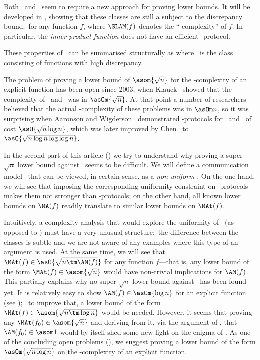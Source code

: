 %
%
%
%
%

Both \LAM\ and \SLAM\ seem to require a new approach for proving lower bounds.
It will be developed in , showing that these classes are still a subject to the discrepancy bound:\ for any function $f$,
where $\SLAM(f)$ denotes the ``\SLAM-complexity'' of $f$.
In particular, the \emph{inner product function} does not have an efficient \SLAM-protocol.

These properties of \SLAM\ can be summarised structurally as
\mal{
\SBP\cup\UAM ~ \sbs ~ \SLAM ~ \sbseq ~ \AM\cap\PP
\,,}
where \PP\ is the class consisting of functions with high discrepancy.

The problem of proving a lower bound of $\asom{\sqrt n}$ for the \MA-complexity of an explicit function has been open since 2003, when Klauck~\cite{K03_Rec} showed that the \MA-complexity of \Disj\ and \IP\ was in $\asOm{\sqrt n}$.
At that point a number of researchers believed that the actual \MA-complexity of these problems was in $\asOm n$, so it was surprising when Aaronson and Wigderson~\cite{AW08_Alg} demonstrated \MA-protocols for \Disj\ and \IP\ of cost $\asO{\sqrt n\log n}$, which was later improved by Chen~\cite{C18_On} to $\asO{\sqrt {n\log n\log\log n}}$.

In the second part of this %
article %
() we try to understand why proving a super-$\sqrt n$ lower bound against \MA\ seems to be difficult.
We will define a communication model \MAt\ that can be viewed, in certain sense, as a \emph{non-uniform} \MA.
On the one hand, we will see that imposing the corresponding uniformity constraint on \MAt-protocols makes them not stronger than \MA-protocols; on the other hand, all known lower bounds on $\MA(f)$ readily translate to similar lower bounds on $\MAt(f)$.

Intuitively, a complexity analysis that would explore the uniformity of \MA\ (as opposed to \MAt) must have a very unusual structure:\ the difference between the classes is subtle and we are not aware of any examples where this type of an argument is used.
At the same time, we will see that $\MAt(f) \in \asO{\sqrt{n\tm\AM(f)}}$ for any function $f$---that is, any lower bound of the form $\MAt(f) \in \asom{\sqrt n}$ would have non-trivial implications for $\AM(f)$.
This partially explains why no super-$\sqrt n$ lower bound against \MA\ has been found yet.\fn
{
  It is relatively easy to show $\AM(f)\in \asOm{\log n}$ for an explicit function (see );\ %
to improve that, a lower bound of the form $\MAt(f) \in \asom{\sqrt{n\tm\log n}}$ would be needed.
However, it seems that proving any $\MAt(f_0) \in \asom{\sqrt n}$ and deriving from it, via the argument of , that $\AM(f_0)\in \asom1$ would by itself shed some new light on the enigma of \AM.
As one of the concluding open problems (), we suggest proving a lower bound of the form $\asOm{\sqrt{n\log n}}$ on the \MA-complexity of an explicit function.
}

